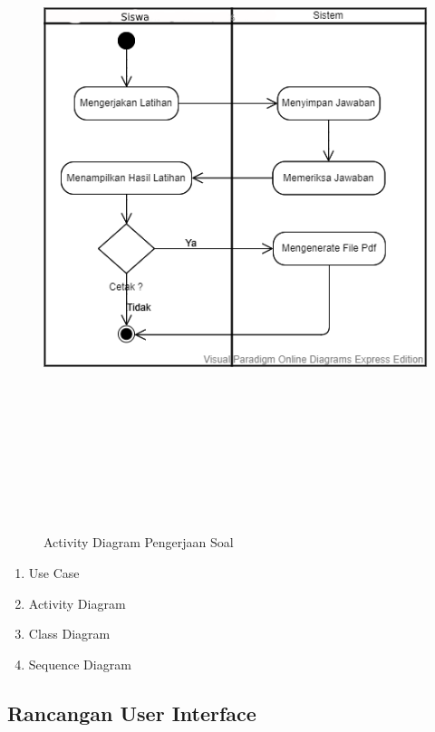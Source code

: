 \documentclass{scrreprt}
\begin{document}
		\begin{figure}
			\includegraphics[width=15cm, height=20cm]{Activity-diagram-latihan.png}
			\caption{Activity Diagram Pengerjaan Soal}
		\end{figure}
		
		\begin{enumerate}
			\item Use Case
			\item Activity Diagram
			\item Class Diagram
			\item Sequence Diagram
		\end{enumerate}
	
	\subsection{Rancangan User Interface}

	
\end{document}
